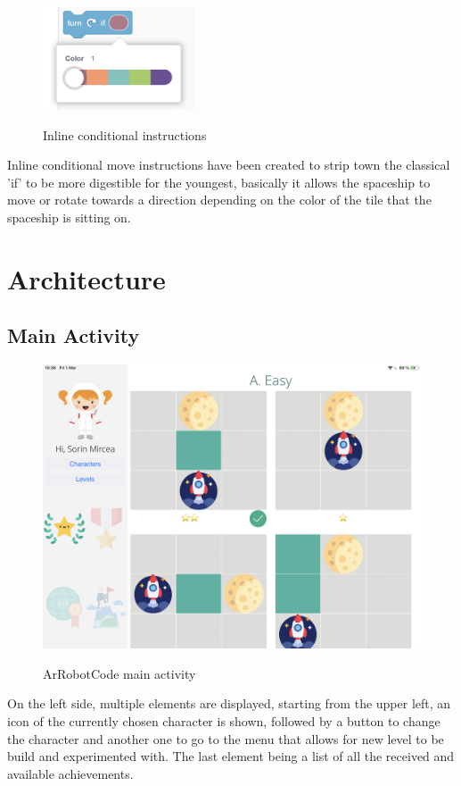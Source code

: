 \documentclass[12 pct]{report}
\begin{document}
\begin{figure}[H]
\includegraphics[width=0.4\textwidth]{newIf}
\centering
\label{fig:hololens}
\caption{Inline conditional instructions}
\end{figure}

Inline conditional move instructions have been created to strip town the classical 'if'  to be more digestible for the youngest, basically it allows the spaceship to move or rotate towards a direction depending on the color  of the tile that the spaceship is sitting on.
\section{Architecture}

\subsection*{Main Activity}
\begin{figure}[H]
\includegraphics[width=1.0\textwidth]{ArRobotCode0}
\centering
\label{fig:hololens}
\caption{ArRobotCode main activity}
\end{figure}

On the left side, multiple elements are displayed, starting from the upper left, an icon of the currently chosen character is shown, followed by a button to change the character and another one to go to the menu that allows for new level to be build and experimented with. The last element being a list of all the received and available achievements.
\end{document}
